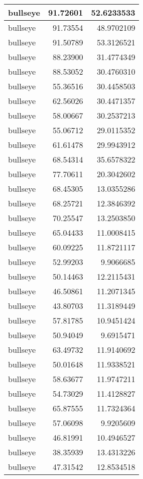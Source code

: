 \documentclass[
]{book}
\theoremstyle{definition}
\theoremstyle{definition}
\theoremstyle{definition}
\theoremstyle{definition}
\theoremstyle{remark}
\begin{document}
\begin{tabular}{l|r|r}
\hline
bullseye & 91.72601 & 52.6233533\\
\hline
bullseye & 91.73554 & 48.9702109\\
\hline
bullseye & 91.50789 & 53.3126521\\
\hline
bullseye & 88.23900 & 31.4774349\\
\hline
bullseye & 88.53052 & 30.4760310\\
\hline
bullseye & 55.36516 & 30.4458503\\
\hline
bullseye & 62.56026 & 30.4471357\\
\hline
bullseye & 58.00667 & 30.2537213\\
\hline
bullseye & 55.06712 & 29.0115352\\
\hline
bullseye & 61.61478 & 29.9943912\\
\hline
bullseye & 68.54314 & 35.6578322\\
\hline
bullseye & 77.70611 & 20.3042602\\
\hline
bullseye & 68.45305 & 13.0355286\\
\hline
bullseye & 68.25721 & 12.3846392\\
\hline
bullseye & 70.25547 & 13.2503850\\
\hline
bullseye & 65.04433 & 11.0008415\\
\hline
bullseye & 60.09225 & 11.8721117\\
\hline
bullseye & 52.99203 & 9.9066685\\
\hline
bullseye & 50.14463 & 12.2115431\\
\hline
bullseye & 46.50861 & 11.2071345\\
\hline
bullseye & 43.80703 & 11.3189449\\
\hline
bullseye & 57.81785 & 10.9451424\\
\hline
bullseye & 50.94049 & 9.6915471\\
\hline
bullseye & 63.49732 & 11.9140692\\
\hline
bullseye & 50.01648 & 11.9338521\\
\hline
bullseye & 58.63677 & 11.9747211\\
\hline
bullseye & 54.73029 & 11.4128827\\
\hline
bullseye & 65.87555 & 11.7324364\\
\hline
bullseye & 57.06098 & 9.9205609\\
\hline
bullseye & 46.81991 & 10.4946527\\
\hline
bullseye & 38.35939 & 13.4313226\\
\hline
bullseye & 47.31542 & 12.8534518\\

\end{tabular}
\end{document}
